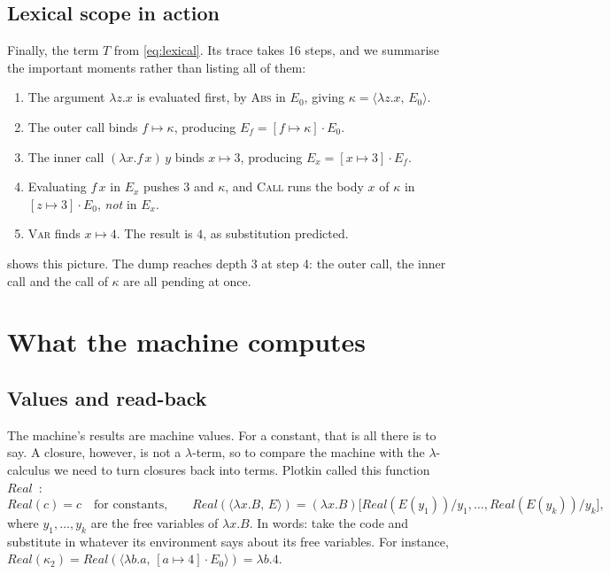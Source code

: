 \documentclass[11pt,a4paper]{article}
\newcommand{\cl}[2]{\langle #1,\, #2\rangle}
\newcommand{\rul}[1]{\textsc{#1}}
\newcommand{\Real}{\mathit{Real}}
\theoremstyle{definition}
\theoremstyle{plain}
\begin{document}
\subsection{Lexical scope in action}

Finally, the term $T$ from \eqref{eq:lexical}. Its trace takes 16 steps, and we
summarise the important moments rather than listing all of them:
\begin{enumerate}[nosep]
\item The argument $\lambda z.x$ is evaluated first, by \rul{Abs} in $E_0$,
  giving $\kappa = \cl{\lambda z.x}{E_0}$.
\item The outer call binds $f\mapsto\kappa$, producing $E_f = [f\mapsto\kappa]\cdot E_0$.
\item The inner call $(\lambda x.f\,x)\,y$ binds $x\mapsto 3$, producing
  $E_x = [x\mapsto 3]\cdot E_f$.
\item Evaluating $f\,x$ in $E_x$ pushes $3$ and $\kappa$, and \rul{Call} runs
  the body $x$ of $\kappa$ in $[z\mapsto 3]\cdot E_0$, \emph{not} in $E_x$.
\item \rul{Var} finds $x\mapsto 4$. The result is $4$, as substitution
  predicted.
\end{enumerate}
 shows this picture. The dump reaches depth $3$ at
step 4: the outer call, the inner call and the call of $\kappa$ are all
pending at once.

\section{What the machine computes}\label{sec:meaning}

\subsection{Values and read-back}

The machine's results are machine values. For a constant, that is all there is to
say. A closure, however, is not a $\lambda$-term, so to compare the machine
with the $\lambda$-calculus we need to turn closures back into terms. Plotkin
called this function $\Real$~\cite{plotkin75}:
\[
  \Real(c) = c \quad\text{for constants,}\qquad
  \Real(\cl{\lambda x.B}{E}) = (\lambda x.B)\bigl[\Real(E(y_1))/y_1, \dots, \Real(E(y_k))/y_k\bigr],
\]
where $y_1,\dots,y_k$ are the free variables of $\lambda x.B$. In words: take the
code and substitute in whatever its environment says about its free variables.
For instance, $\Real(\kappa_2) = \Real(\cl{\lambda b.a}{[a\mapsto 4]\cdot E_0}) = \lambda b.4$.
\end{document}
